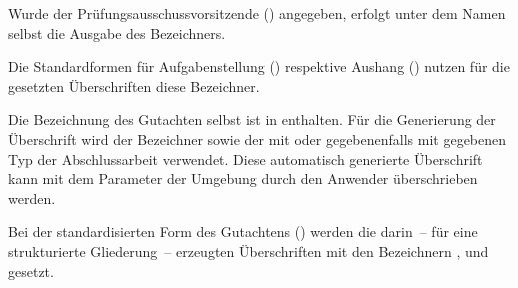 \begin{DeclareEntity}{}
\begin{Declaration}
  {}
\printdeclarationlist

Wurde der Prüfungsausschussvorsitzende () angegeben, erfolgt 
unter dem Namen selbst die Ausgabe des Bezeichners.
\end{Declaration}

\begin{Declaration}
  {}
\begin{Declaration}
  {}
\printdeclarationlist

Die Standardformen für Aufgabenstellung () respektive Aushang 
() nutzen für die gesetzten Überschriften diese Bezeichner.
\end{Declaration}
\end{Declaration}

\begin{Declaration}
  {}
\begin{Declaration}
  {}
\printdeclarationlist

Die Bezeichnung des Gutachten selbst ist in  enthalten. 
Für die Generierung der Überschrift wird der Bezeichner  
sowie der mit  oder gegebenenfalls mit  gegebenen 
Typ der Abschlussarbeit verwendet. Diese automatisch generierte Überschrift 
kann mit dem Parameter  der 
Umgebung  durch den Anwender überschrieben werden.
\end{Declaration}
\end{Declaration}

\begin{Declaration}
  {}
\begin{Declaration}
  {}
\printdeclarationlist

Bei der standardisierten Form des Gutachtens () werden 
die darin~-- für eine strukturierte Gliederung~-- erzeugten Überschriften mit 
den Bezeichnern ,  und  
gesetzt.
\end{Declaration}
\end{Declaration}

\begin{Declaration}
  {}
\printdeclarationlist


\end{Declaration}
\end{DeclareEntity}
